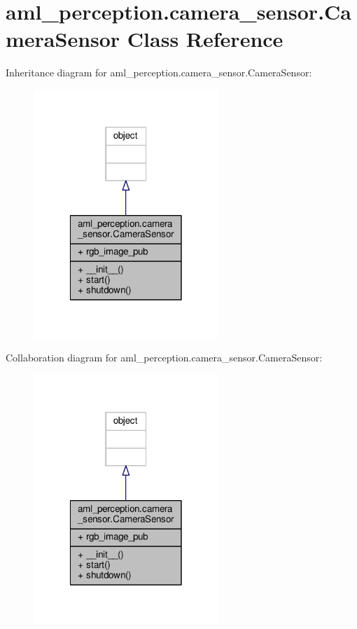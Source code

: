 \hypertarget{classaml__perception_1_1camera__sensor_1_1_camera_sensor}{\section{aml\-\_\-perception.\-camera\-\_\-sensor.\-Camera\-Sensor Class Reference}
\label{classaml__perception_1_1camera__sensor_1_1_camera_sensor}
}


Inheritance diagram for aml\-\_\-perception.\-camera\-\_\-sensor.\-Camera\-Sensor\-:\nopagebreak
\begin{figure}[H]
\begin{center}
\leavevmode
\includegraphics[width=198pt]{classaml__perception_1_1camera__sensor_1_1_camera_sensor__inherit__graph}
\end{center}
\end{figure}


Collaboration diagram for aml\-\_\-perception.\-camera\-\_\-sensor.\-Camera\-Sensor\-:\nopagebreak
\begin{figure}[H]
\begin{center}
\leavevmode
\includegraphics[width=198pt]{classaml__perception_1_1camera__sensor_1_1_camera_sensor__coll__graph}
\end{center}
\end{figure}
